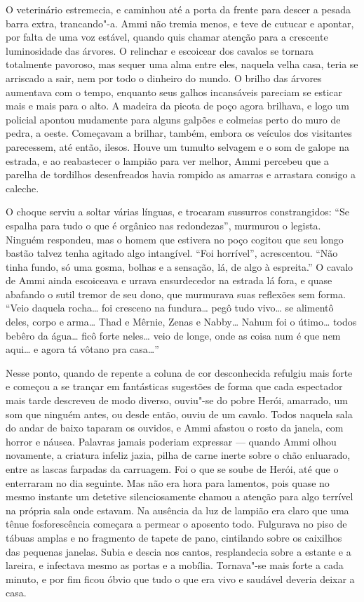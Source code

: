 O veterinário estremecia, e caminhou até a porta da frente para descer a
pesada barra extra, trancando"-a. Ammi não tremia menos, e teve de
cutucar e apontar, por falta de uma voz estável, quando quis chamar
atenção para a crescente luminosidade das árvores. O relinchar e
escoicear dos cavalos se tornara totalmente pavoroso, mas sequer uma
alma entre eles, naquela velha casa, teria se arriscado a sair, nem por
todo o dinheiro do mundo. O brilho das árvores aumentava com o tempo,
enquanto seus galhos incansáveis pareciam se esticar mais e mais para o
alto. A madeira da picota de poço agora brilhava, e logo um policial
apontou mudamente para alguns galpões e colmeias perto do muro de pedra,
a oeste. Começavam a brilhar, também, embora os veículos dos visitantes
parecessem, até então, ilesos. Houve um tumulto selvagem e o som de
galope na estrada, e ao reabastecer o lampião para ver melhor, Ammi
percebeu que a parelha de tordilhos desenfreados havia rompido as
amarras e arrastara consigo a caleche.

O choque serviu a soltar várias línguas, e trocaram sussurros
constrangidos: ``Se espalha para tudo o que é orgânico nas redondezas'',
murmurou o legista. Ninguém respondeu, mas o homem que estivera no poço
cogitou que seu longo bastão talvez tenha agitado algo intangível. ``Foi
horrível'', acrescentou. ``Não tinha fundo, só uma gosma, bolhas e a
sensação, lá, de algo à espreita.'' O cavalo de Ammi ainda escoiceava e
urrava ensurdecedor na estrada lá fora, e quase abafando o sutil tremor
de seu dono, que murmurava suas reflexões sem forma. ``Veio daquela
rocha\ldots{} foi cresceno na fundura\ldots{} pegô tudo vivo\ldots{} se
alimentô deles, corpo e arma\ldots{} Thad e Mêrnie, Zenas e Nabby\ldots{}
Nahum foi o útimo\ldots{} todos bebêro da água\ldots{} ficô forte neles\ldots{} veio de longe, onde as coisa num é que nem aqui\ldots{} e agora tá
vôtano pra casa\ldots{}''

Nesse ponto, quando de repente a coluna de cor desconhecida refulgiu
mais forte e começou a se trançar em fantásticas sugestões de forma que
cada espectador mais tarde descreveu de modo diverso, ouviu"-se do pobre
Herói, amarrado, um som que ninguém antes, ou desde então, ouviu de um
cavalo. Todos naquela sala do andar de baixo taparam os ouvidos, e Ammi
afastou o rosto da janela, com horror e náusea. Palavras jamais poderiam
expressar --- quando Ammi olhou novamente, a criatura infeliz jazia,
pilha de carne inerte sobre o chão enluarado, entre as lascas farpadas
da carruagem. Foi o que se soube de Herói, até que o enterraram no dia
seguinte. Mas não era hora para lamentos, pois quase no mesmo instante
um detetive silenciosamente chamou a atenção para algo terrível na
própria sala onde estavam. Na ausência da luz de lampião era claro que
uma tênue fosforescência começara a permear o aposento todo. Fulgurava
no piso de tábuas amplas e no fragmento de tapete de pano, cintilando
sobre os caixilhos das pequenas janelas. Subia e descia nos cantos,
resplandecia sobre a estante e a lareira, e infectava mesmo as portas e
a mobília. Tornava"-se mais forte a cada minuto, e por fim ficou óbvio
que tudo o que era vivo e saudável deveria deixar a casa.

